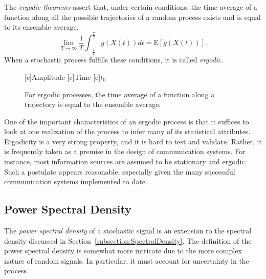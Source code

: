 \begin{definition}[Ergodicity]
The \emph{ergodic theorems} assert that, under certain conditions, the time average of a function along all the possible trajectories of a random process exists and is equal to its ensemble average,
\begin{equation*}
\lim_{T \rightarrow \infty} \frac{1}{T} \int_{- \frac{T}{2}}^{\frac{T}{2}} g(X(t)) dt
= \mathrm{E}[g(X(t))] .
\end{equation*}
When a stochastic process fulfills these conditions, it is called \emph{ergodic}.
\end{definition}

\begin{figure}[htbp]
\begin{center}
\begin{psfrags}
[c]{Amplitude}
[c]{Time}
[c]{$t_0$}
\end{psfrags}
\caption{For ergodic processes, the time average of a function along a trajectory is equal to the ensemble average.}
\label{figure:ErgodicProcess}
\end{center}
\end{figure}

One of the important characteristics of an ergodic process is that it suffices to look at one realization of the process to infer many of its statistical attributes.
Ergodicity is a very strong property, and it is hard to test and validate.
Rather, it is frequently taken as a premise in the design of communication systems.
For instance, most information sources are assumed to be stationary and ergodic.
Such a postulate appears reasonable, especially given the many successful communication systems implemented to date.


\subsection{Power Spectral Density}

The \emph{power spectral density} of a stochastic signal is an extension to the spectral density discussed in Section~\ref{subsection:SpectralDensity}.
The definition of the power spectral density is somewhat more intricate due to the more complex nature of random signals.
In particular, it must account for uncertainty in the process.

